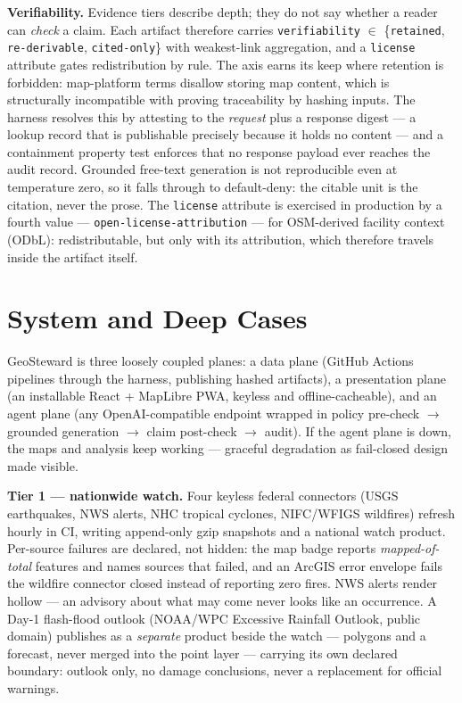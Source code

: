 \documentclass[sigconf,screen]{acmart}
\begin{document}
\textbf{Verifiability.} Evidence tiers describe depth; they do not say
whether a reader can \emph{check} a claim. Each artifact therefore
carries \texttt{verifiability} $\in$ \{\texttt{retained},
\texttt{re-derivable}, \texttt{cited-only}\} with weakest-link
aggregation, and a \texttt{license} attribute gates redistribution by
rule. The axis earns its keep where retention is forbidden: map-platform terms disallow storing map content, which is structurally
incompatible with proving traceability by hashing inputs. The harness
resolves this by attesting to the \emph{request} plus a response digest
--- a lookup record that is publishable precisely because it holds no
content --- and a containment property test enforces that no response
payload ever reaches the audit record. Grounded free-text generation is
not reproducible even at temperature zero, so it falls through to
default-deny: the citable unit is the citation, never the prose. The
\texttt{license} attribute is exercised in production by a fourth value
--- \texttt{open-license-attribution} --- for OSM-derived facility
context (ODbL): redistributable, but only with its attribution, which
therefore travels inside the artifact itself.

\section{System and Deep Cases}

GeoSteward is three loosely coupled planes: a data plane (GitHub Actions
pipelines through the harness, publishing hashed artifacts), a
presentation plane (an installable React + MapLibre PWA, keyless and
offline-cacheable), and an agent plane (any OpenAI-compatible endpoint
wrapped in policy pre-check $\rightarrow$ grounded generation
$\rightarrow$ claim post-check $\rightarrow$ audit). If the agent plane
is down, the maps and analysis keep working --- graceful degradation as
fail-closed design made visible.

\textbf{Tier 1 --- nationwide watch.} Four keyless federal connectors
(USGS earthquakes, NWS alerts, NHC tropical cyclones, NIFC/WFIGS
wildfires) refresh hourly in CI, writing append-only gzip snapshots and
a national watch product. Per-source failures are declared, not hidden:
the map badge reports \emph{mapped-of-total} features and names sources
that failed, and an ArcGIS error envelope fails the wildfire connector
closed instead of reporting zero fires. NWS alerts render hollow ---
an advisory about what may come never looks like an occurrence. A
Day-1 flash-flood outlook (NOAA/WPC Excessive Rainfall Outlook, public
domain) publishes as a \emph{separate} product beside the watch ---
polygons and a forecast, never merged into the point layer --- carrying
its own declared boundary: outlook only, no damage conclusions, never a
replacement for official warnings.
\end{document}

